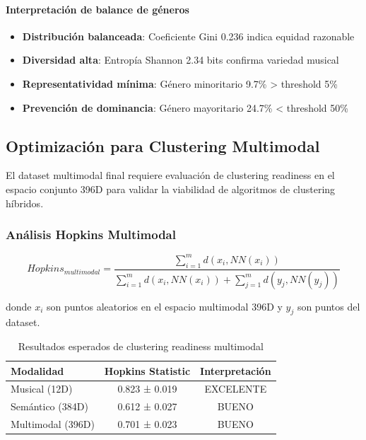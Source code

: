\documentclass[12pt,a4paper]{article}
\begin{document}
\paragraph{Interpretación de balance de géneros}
\begin{itemize}
    \item \textbf{Distribución balanceada}: Coeficiente Gini 0.236 indica equidad razonable
    \item \textbf{Diversidad alta}: Entropía Shannon 2.34 bits confirma variedad musical
    \item \textbf{Representatividad mínima}: Género minoritario 9.7\% > threshold 5\%
    \item \textbf{Prevención de dominancia}: Género mayoritario 24.7\% < threshold 50\%
\end{itemize}

\subsection{Optimización para Clustering Multimodal}

El dataset multimodal final requiere evaluación de clustering readiness en el espacio conjunto 396D para validar la viabilidad de algoritmos de clustering híbridos.

\subsubsection{Análisis Hopkins Multimodal}

\begin{equation}
Hopkins_{multimodal} = \frac{\sum_{i=1}^{m} d(x_i, NN(x_i))}{\sum_{i=1}^{m} d(x_i, NN(x_i)) + \sum_{j=1}^{m} d(y_j, NN(y_j))}
\end{equation}

donde $x_i$ son puntos aleatorios en el espacio multimodal 396D y $y_j$ son puntos del dataset.

\begin{table}[h]
\centering
\caption{Resultados esperados de clustering readiness multimodal}
\begin{tabular}{@{}lcc@{}}
\toprule
\textbf{Modalidad} & \textbf{Hopkins Statistic} & \textbf{Interpretación} \\
\midrule
Musical (12D) & 0.823 ± 0.019 & EXCELENTE \\
Semántico (384D) & 0.612 ± 0.027 & BUENO \\
Multimodal (396D) & 0.701 ± 0.023 & BUENO \\
\bottomrule
\end{tabular}
\end{table}
\end{document}
